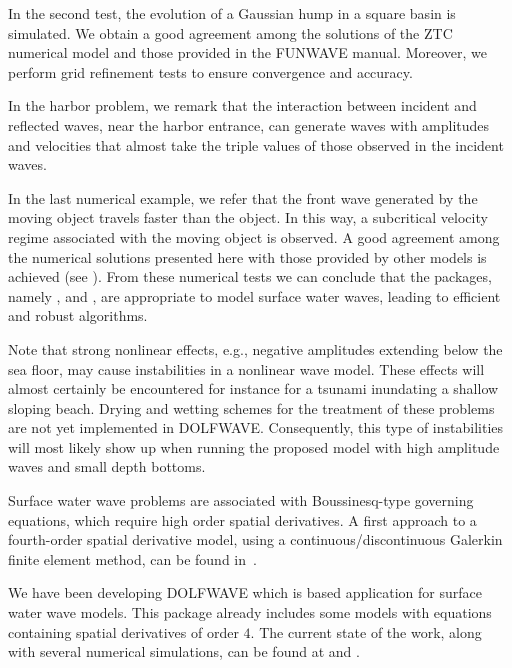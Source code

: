   In the second test, the evolution of a Gaussian hump in a
square basin is simulated.  We obtain a good agreement among
the solutions of the ZTC numerical model and those provided
in the FUNWAVE manual.  Moreover, we perform grid refinement
tests to ensure convergence and accuracy.

In the harbor problem, we
remark that the interaction between incident and reflected
waves, near the harbor entrance, can generate waves with
amplitudes and velocities that almost take the triple values
of those observed in the incident waves.

In the last
numerical example, we refer that the front wave generated by the
moving object travels faster than the object.  In this way,
a subcritical velocity regime associated with the moving
object is observed.  A good agreement among the numerical
solutions presented here with those provided by other models
is achieved (see ).  From these numerical
tests we can conclude that the \fenics packages,
namely \dolfin, \ufl and \ffc, are appropriate to model
surface water waves, leading to efficient and robust
algorithms.

Note that  strong nonlinear
effects, e.g., negative amplitudes extending below the sea floor,
may cause instabilities in a nonlinear wave model.
These effects will almost
certainly be encountered for instance for a tsunami
inundating a shallow sloping beach.
Drying and wetting schemes for the treatment of these problems are
not yet implemented in DOLFWAVE.
Consequently, this type of instabilities will most likely
show up when running the proposed model with  high amplitude
waves  and small depth bottoms.

Surface water wave problems are associated with
Boussinesq-type governing equations, which require high
order spatial derivatives. A first approach to a
fourth-order spatial derivative model, using a
continuous/discontinuous Galerkin finite element method, can
be found in~\citet{LopesPereiraTrabucho}.

We have been developing DOLFWAVE which is \fenics based application
for surface water wave models. This package already includes some
models with equations containing spatial derivatives of order $4$.
The current state of the work, along with several nume\-ri\-cal
simulations, can be found at  and
.
